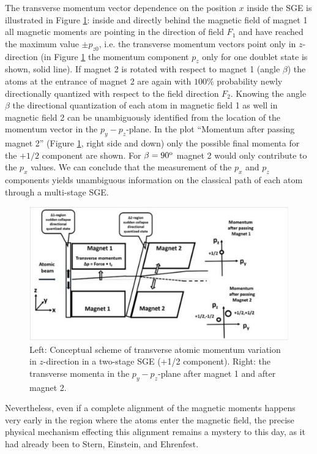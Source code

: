 \documentclass{article}
\begin{document}
The transverse momentum vector dependence on the position $x$ inside the SGE is illustrated in Figure \ref{fig:SGEtwostage}: inside and directly behind the magnetic field of magnet 1 all magnetic moments are pointing in the direction of field $F_1$ and have reached the maximum value $\pm p_{z0}$, i.e. the transverse momentum vectors point only in $z$-direction (in Figure \ref{fig:SGEtwostage} the momentum component $p_z$  only for one doublet state is shown, solid line). If magnet 2 is rotated with respect to magnet 1 (angle $\beta$) the atoms at the entrance of magnet 2 are again with $100\%$ probability newly directionally quantized with respect to the field direction $F_2$. Knowing the angle $\beta$ the directional quantization of each atom in magnetic field 1 as well in magnetic field 2 can be unambiguously identified from the location of the momentum vector in the $p_y-p_z$-plane. In the plot ``Momentum after passing magnet 2'' (Figure \ref{fig:SGEtwostage}, right side and down) only the possible final momenta for the $+1/2$ component are shown. For $\beta=90^{\rm o}$ magnet 2 would only contribute to the $p_x$ values. We can conclude that the measurement of the $p_x$ and $p_z$ components yields unambiguous information on the classical path of each atom through a multi-stage SGE. 
%
\begin{figure}
\begin{center}
\includegraphics[scale=0.4]{figures/SGE_twostage}
\caption{Left: Conceptual scheme of transverse atomic momentum variation in $z$-direction in a two-stage SGE (+1/2 component). Right: the transverse momenta in the $p_y-p_z$-plane after magnet 1 and after magnet 2. }
\label{fig:SGEtwostage}
\end{center}
\end{figure}
%

Nevertheless, even if a complete alignment of the magnetic moments happens very early in the region where the atoms enter the magnetic field, the precise physical mechanism effecting this alignment remains a mystery to this day, as it had already been to Stern, Einstein, and Ehrenfest.
\end{document}
